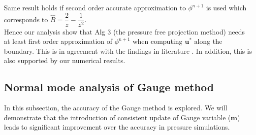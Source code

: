 Same result holds if second order accurate approximation to $\phi^{n+1}$ is used which corresponds to $\hat{B} = \dfrac{2}{z}- \dfrac{1}{z^2}$.\\

Hence our analysis show that Alg 3 (the pressure free projection method) needs at least first order approximation of $\phi^{n+1}$ when computing $\textbf{u}^*$ along the boundary. This is in agreement with the findings in literature \cite{brown2001accurate,strikwerda1999accuracy}. In addition, this is also supported by our numerical results.

\subsection{Normal mode analysis of Gauge method}
In this subsection, the accuracy of the Gauge method is explored. We will demonstrate that the introduction of consistent update of Gauge variable ($\textbf{m}$) leads to significant improvement over the accuracy in pressure simulations.\\

